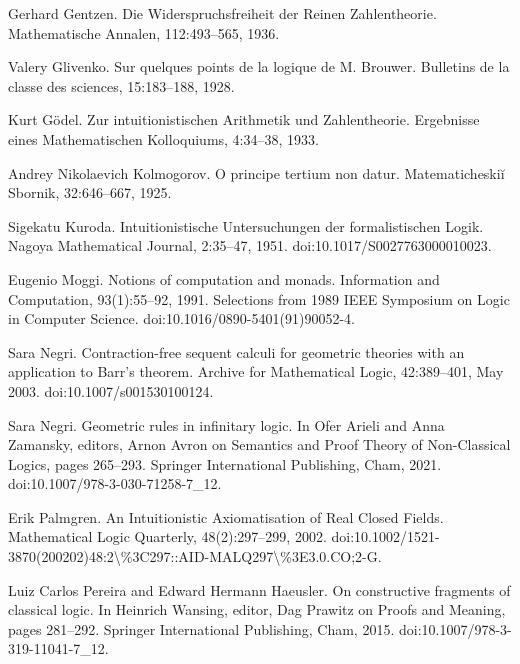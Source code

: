 \par\noindent  [10]  Gerhard Gentzen.  Die Widerspruchsfreiheit der Reinen Zahlentheorie.  Mathematische Annalen, 112:493–565, 1936.  
 
\par\noindent  [11]  Valery Glivenko.  Sur quelques points de la logique de M. Brouwer.  Bulletins de la classe des sciences, 15:183–188, 1928.  
 
\par\noindent  [12]  Kurt Gödel.  Zur intuitionistischen Arithmetik und Zahlentheorie.  Ergebnisse eines Mathematischen Kolloquiums, 4:34–38, 1933.  
 
\par\noindent  [13]  Andrey Nikolaevich Kolmogorov.  O principe tertium non datur.  Matematicheskiĭ Sbornik, 32:646–667, 1925.  
 
\par\noindent  [14]  Sigekatu Kuroda.  Intuitionistische Untersuchungen der formalistischen Logik.  Nagoya Mathematical Journal, 2:35–47, 1951.  doi:10.1017/S0027763000010023.  
 
\par\noindent  [15]  Eugenio Moggi.  Notions of computation and monads.  Information and Computation, 93(1):55–92, 1991.  Selections from 1989 IEEE Symposium on Logic in Computer Science.  doi:10.1016/0890-5401(91)90052-4.  
 
\par\noindent  [16]  Sara Negri.  Contraction-free sequent calculi for geometric theories with an application to Barr’s theorem.  Archive for Mathematical Logic, 42:389–401, May 2003.  doi:10.1007/s001530100124.  
 
\par\noindent  [17]  Sara Negri.  Geometric rules in infinitary logic.  In Ofer Arieli and Anna Zamansky, editors, Arnon Avron on Semantics and Proof Theory of Non-Classical Logics, pages 265–293. Springer International Publishing, Cham, 2021.  doi:10.1007/978-3-030-71258-7\_12.  
 
\par\noindent  [18]  Erik Palmgren.  An Intuitionistic Axiomatisation of Real Closed Fields.  Mathematical Logic Quarterly, 48(2):297–299, 2002.  doi:10.1002/1521-3870(200202)48:2\textbackslash{}\%3C297::AID-MALQ297\textbackslash{}\%3E3.0.CO;2-G.  
 
\par\noindent  [19]  Luiz Carlos Pereira and Edward Hermann Haeusler.  On constructive fragments of classical logic.  In Heinrich Wansing, editor, Dag Prawitz on Proofs and Meaning, pages 281–292. Springer International Publishing, Cham, 2015.  doi:10.1007/978-3-319-11041-7\_12.  
 
